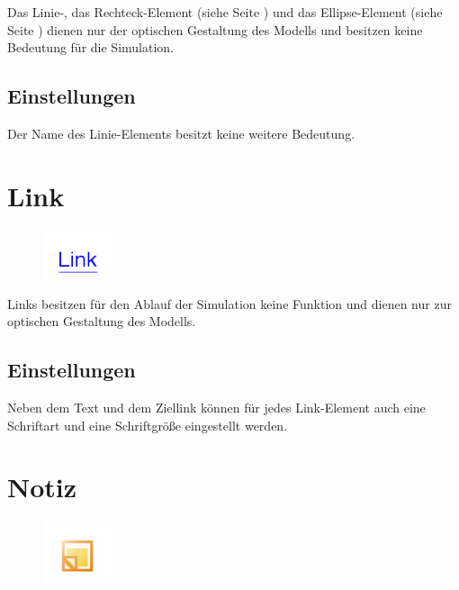 Das Linie-, das Rechteck-Element (siehe Seite \pageref{ref:ModelElementRectangle}) und das
Ellipse-Element (siehe Seite \pageref{ref:ModelElementEllipse}) dienen nur der optischen Gestaltung
des Modells und besitzen keine Bedeutung für die Simulation.

\subsection*{Einstellungen}

Der Name des Linie-Elements besitzt keine weitere Bedeutung.


\section{Link}
\label{ref:ModelElementLink}

\begin{figure}
\vspace{-22pt}
\includegraphics[width=2cm]{imageModelElementLink.png}
\vspace{-22pt}
\end{figure}

Links besitzen für den Ablauf der Simulation keine Funktion und dienen nur zur optischen Gestaltung des Modells.

\subsection*{Einstellungen}

Neben dem Text und dem Ziellink können für jedes Link-Element auch eine Schriftart und eine Schriftgröße eingestellt werden.


\section{Notiz}
\label{ref:ModelElementNote}

\begin{figure}
\vspace{-22pt}
\includegraphics[width=2cm]{imageModelElementNote.png}
\vspace{-22pt}
\end{figure}

